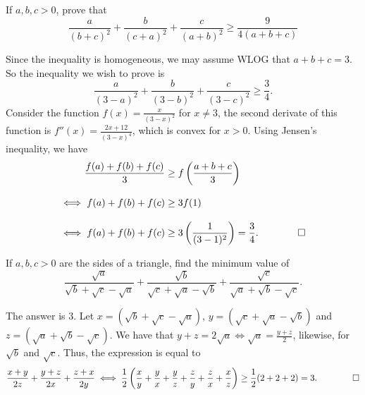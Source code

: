 \documentclass[12pt, paper=letter]{scrartcl}
\begin{document}
    \begin{problem*}
        If $a,b,c > 0$, prove that
        \[
            \frac{a}{(b + c)^2} + \frac{b}{(c + a)^2} + \frac{c}{(a + b)^2} \geq \frac{9}{4(a + b + c)}
        \]
    \end{problem*}
    \begin{solution*}
        Since the inequality is homogeneous, we may assume WLOG that $a + b + c = 3$.
        So the inequality we wish to prove is
        \[
            \frac{a}{(3 - a)^2} + \frac{b}{(3 - b)^2} + \frac{c}{(3 - c)^2} \geq \frac{3}{4}.
        \]
        Consider the function $f(x) = \frac{x}{(3 - x)^2}$ for $x \neq 3$, the second derivate of this function is $f''(x) = \frac{2x + 12}{(3 - x)^4}$, which is convex for $x > 0$.
        Using Jensen's inequality, we have
        \begin{align*}
            \frac{f(a) + f(b) + f(c)}{3} &\geq f \left(\frac{a + b + c }{3}\right)\\[3mm]
            \iff f(a) + f(b) + f(c) &\geq 3 f(1)\\[3mm]
            \iff f(a) + f(b) + f(c) &\geq 3 \left(\frac{1}{(3 - 1)^2}\right) = \frac{3}{4}. \qquad \qedhere
        \end{align*}
    \end{solution*}

    \begin{problem*}
        If $a,b,c > 0$ are the sides of a triangle, find the minimum value of
        \[
            \frac{\sqrt {a}}{\sqrt {b} + \sqrt {c} - \sqrt {a}} + \frac{\sqrt {b}}{\sqrt {c} + \sqrt {a} - \sqrt {b}} + \frac{\sqrt {c}}{\sqrt {a} + \sqrt {b} - \sqrt {c}}.
        \]
    \end{problem*}
    \begin{solution*}
        The answer is 3.
        Let $x = \left(\sqrt {b} + \sqrt {c} - \sqrt {a}\right)$, $y = (\sqrt {c} + \sqrt {a} - \sqrt {b})$ and $z = (\sqrt {a} + \sqrt {b} - \sqrt {c})$.
        We have that $y + z = 2 \sqrt {a} \iff \sqrt {a} = \frac{y + z}{2}$, likewise, for $\sqrt {b}$ and $\sqrt {c}$.
        Thus, the expression is equal to
        \begin{align*}
            \frac{x + y}{2z} + \frac{y + z}{2x} + \frac{z + x}{2y}
            \iff \frac{1}{2} \left(\frac{x}{y} + \frac{y}{x} + \frac{y}{z} + \frac{z}{y} + \frac{z}{x} + \frac{x}{z}\right)
            \geq \frac{1}{2} (2 + 2 + 2) = 3. \qquad\qedhere
        \end{align*}
    \end{solution*}
\end{document}
